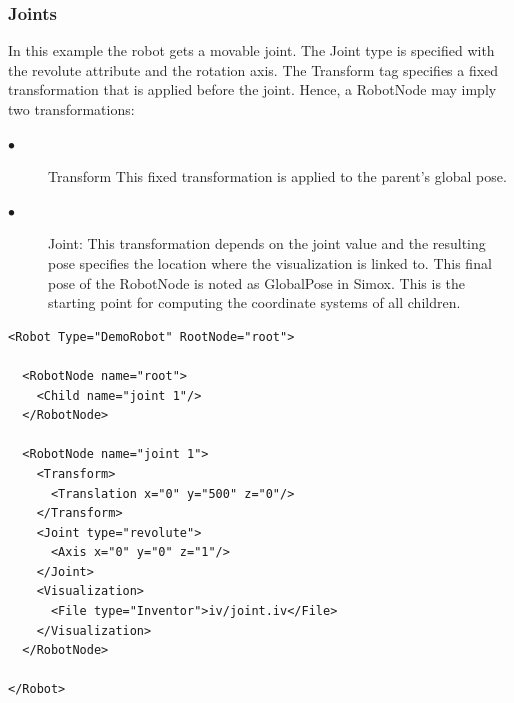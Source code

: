 \subsubsection{Joints}
\par
In this example the robot gets a movable joint. The Joint type is specified with the revolute attribute and the rotation axis. The Transform tag specifies a fixed transformation that is applied before the joint. Hence, a RobotNode may imply two transformations:
\begin{description}
   \item[$\bullet$] Transform This fixed transformation is applied to the parent's global pose.
 \item[$\bullet$]Joint: This transformation depends on the joint value and the resulting pose specifies the location where the visualization is linked to. This final pose of the RobotNode is noted as GlobalPose in Simox. This is the starting point for computing the coordinate systems of all children. 
\end{description}
\par
\begin{lstlisting}
<Robot Type="DemoRobot" RootNode="root">

  <RobotNode name="root">
    <Child name="joint 1"/>
  </RobotNode>

  <RobotNode name="joint 1">
    <Transform>
      <Translation x="0" y="500" z="0"/>
    </Transform>
    <Joint type="revolute">
      <Axis x="0" y="0" z="1"/>
    </Joint>
    <Visualization>
      <File type="Inventor">iv/joint.iv</File>
    </Visualization>
  </RobotNode>

</Robot>
\end{lstlisting}

